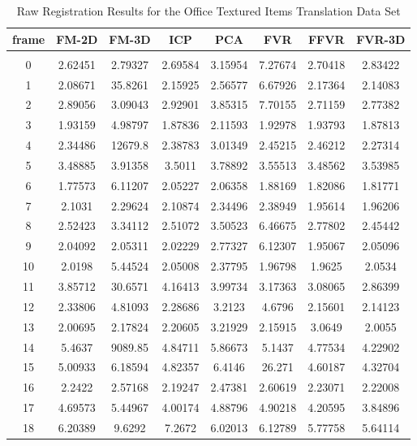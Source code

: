 \begin{center}
\begin{longtable}{cccccccc}
\caption{Raw Registration Results for the Office Textured Items Translation Data Set}
\label{tab:officetextureditemstranslationFULL}
\endfirsthead
\endhead
\textbf{frame} & \textbf{FM-2D} & \textbf{FM-3D} & \textbf{ICP} & \textbf{PCA} & \textbf{FVR} & \textbf{FFVR} & \textbf{FVR-3D} \\
\hline \\
0 & 2.62451 & 2.79327 & 2.69584 & 3.15954 & 7.27674 & 2.70418 & 2.83422\\
1 & 2.08671 & 35.8261 & 2.15925 & 2.56577 & 6.67926 & 2.17364 & 2.14083\\
2 & 2.89056 & 3.09043 & 2.92901 & 3.85315 & 7.70155 & 2.71159 & 2.77382\\
3 & 1.93159 & 4.98797 & 1.87836 & 2.11593 & 1.92978 & 1.93793 & 1.87813\\
4 & 2.34486 & 12679.8 & 2.38783 & 3.01349 & 2.45215 & 2.46212 & 2.27314\\
5 & 3.48885 & 3.91358 & 3.5011 & 3.78892 & 3.55513 & 3.48562 & 3.53985\\
6 & 1.77573 & 6.11207 & 2.05227 & 2.06358 & 1.88169 & 1.82086 & 1.81771\\
7 & 2.1031 & 2.29624 & 2.10874 & 2.34496 & 2.38949 & 1.95614 & 1.96206\\
8 & 2.52423 & 3.34112 & 2.51072 & 3.50523 & 6.46675 & 2.77802 & 2.45442\\
9 & 2.04092 & 2.05311 & 2.02229 & 2.77327 & 6.12307 & 1.95067 & 2.05096\\
10 & 2.0198 & 5.44524 & 2.05008 & 2.37795 & 1.96798 & 1.9625 & 2.0534\\
11 & 3.85712 & 30.6571 & 4.16413 & 3.99734 & 3.17363 & 3.08065 & 2.86399\\
12 & 2.33806 & 4.81093 & 2.28686 & 3.2123 & 4.6796 & 2.15601 & 2.14123\\
13 & 2.00695 & 2.17824 & 2.20605 & 3.21929 & 2.15915 & 3.0649 & 2.0055\\
14 & 5.4637 & 9089.85 & 4.84711 & 5.86673 & 5.1437 & 4.77534 & 4.22902\\
15 & 5.00933 & 6.18594 & 4.82357 & 6.4146 & 26.271 & 4.60187 & 4.32704\\
16 & 2.2422 & 2.57168 & 2.19247 & 2.47381 & 2.60619 & 2.23071 & 2.22008\\
17 & 4.69573 & 5.44967 & 4.00174 & 4.88796 & 4.90218 & 4.20595 & 3.84896\\
18 & 6.20389 & 9.6292 & 7.2672 & 6.02013 & 6.12789 & 5.77758 & 5.64114\\

\end{longtable}
\end{center}
